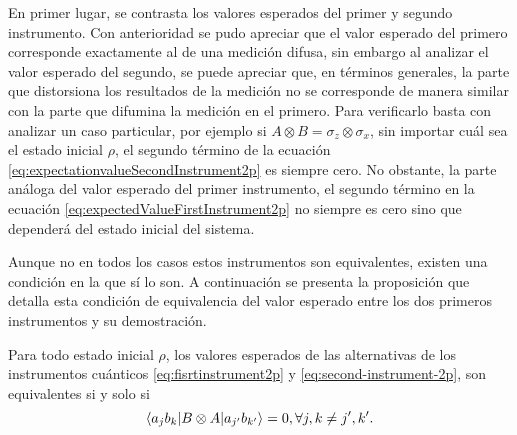 En primer lugar, se contrasta los valores esperados del primer y segundo
instrumento. Con anterioridad se pudo apreciar que el valor esperado del
primero corresponde exactamente al de una medición difusa, sin embargo al
analizar el valor esperado del segundo, se puede apreciar que, en términos
generales, la parte que distorsiona los resultados de la medición no se
corresponde de manera similar con la parte que difumina la medición en el
primero. Para verificarlo basta con analizar un caso particular, por ejemplo si
$A\otimes B= \sigma_z\otimes \sigma_x$, sin importar cuál sea el estado inicial
$\rho$, el segundo término de  la ecuación
{\eqref{eq:expectationvalueSecondInstrument2p}} es siempre cero. No obstante,
la parte análoga del valor esperado del primer instrumento, el segundo término
en la ecuación {\eqref{eq:expectedValueFirstInstrument2p}} no siempre es cero
sino que dependerá del estado inicial del sistema.  


Aunque no en todos los casos estos instrumentos son equivalentes, existen una
condición en la que sí lo son. A continuación se presenta la proposición que
detalla esta condición de equivalencia del valor esperado entre los dos
primeros instrumentos y su demostración.


\begin{proposition}\label{prop:Equivalencia-instruments1-2}
    Para todo estado inicial $\rho$, los valores esperados de las alternativas
de los instrumentos cuánticos {\eqref{eq:fisrtinstrument2p}} y
{\eqref{eq:second-instrument-2p}}, son equivalentes si y solo si \begin{equation}\label{eq:Condicion-equivalencia1-2}
    \langle a_j
b_k|B\otimes A|a_{j'}b_{k'}\rangle=0, \forall j,k\ne j',k'.
\end{equation}
\end{proposition}

